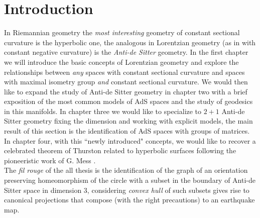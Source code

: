 \chapter*{Introduction}
In Riemannian geometry the \textit{most interesting} geometry of constant sectional curvature is the hyperbolic one, the analogous in Lorentzian geometry  (as in with constant negative curvature) is the \textit{Anti-de Sitter} geometry. In the first chapter we will introduce the basic concepts of Lorentzian geometry and explore the relationships between \textit{any} spaces with constant sectional curvature and spaces with maximal isometry group \textit{and} constant sectional curvature.
We would then like to expand the study of Anti-de Sitter geometry in chapter two with a brief exposition of the most common models of AdS spaces and the study of geodesics in this manifolds. 
In chapter three we would like to specialize to $2+1$ Anti-de Sitter geometry fixing the dimension and working with explicit models, the main result of this section is the identification of AdS spaces with groups of matrices. 
In chapter four, with this ``newly introduced" concepts, we would like to recover a celebrated theorem of Thurston \cite{thurston1986earthquakes} related to hyperbolic surfaces following the pioneeristic work of G. Mess \cite{Mess}. \\
The \textit{fil rouge} of the all thesis is the identification of the graph of an orientation preserving homeomorphism of the circle with a subset in the boundary of Anti-de Sitter space in dimension 3, considering \textit{convex hull} of such subsets gives rise to canonical projections that compose (with the right precautions) to an earthquake map.